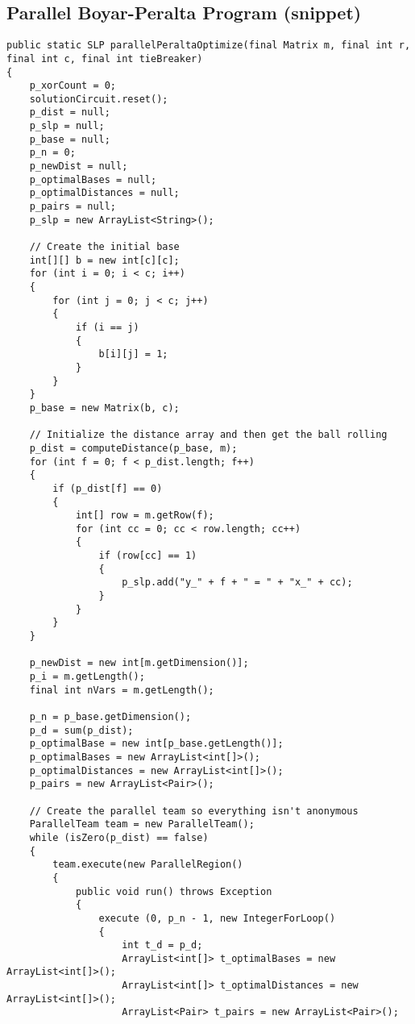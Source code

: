 \subsection{Parallel Boyar-Peralta Program (snippet)}
\begin{verbatim}
public static SLP parallelPeraltaOptimize(final Matrix m, final int r, final int c, final int tieBreaker) 
{
    p_xorCount = 0;
    solutionCircuit.reset();
    p_dist = null;
    p_slp = null;
    p_base = null;
    p_n = 0;
    p_newDist = null;
    p_optimalBases = null;
    p_optimalDistances = null;
    p_pairs = null;
    p_slp = new ArrayList<String>();

    // Create the initial base
    int[][] b = new int[c][c];
    for (int i = 0; i < c; i++)
    {
        for (int j = 0; j < c; j++)
        {
            if (i == j)
            {
                b[i][j] = 1;
            }
        }
    }
    p_base = new Matrix(b, c);
    
    // Initialize the distance array and then get the ball rolling
    p_dist = computeDistance(p_base, m);
    for (int f = 0; f < p_dist.length; f++)
    {
        if (p_dist[f] == 0)
        {
            int[] row = m.getRow(f);
            for (int cc = 0; cc < row.length; cc++)
            {
                if (row[cc] == 1)
                {
                    p_slp.add("y_" + f + " = " + "x_" + cc);
                }
            }
        }
    }

    p_newDist = new int[m.getDimension()];
    p_i = m.getLength();
    final int nVars = m.getLength();

    p_n = p_base.getDimension(); 
    p_d = sum(p_dist);
    p_optimalBase = new int[p_base.getLength()]; 
    p_optimalBases = new ArrayList<int[]>();
    p_optimalDistances = new ArrayList<int[]>();
    p_pairs = new ArrayList<Pair>();

    // Create the parallel team so everything isn't anonymous
    ParallelTeam team = new ParallelTeam();
    while (isZero(p_dist) == false)
    {
        team.execute(new ParallelRegion() 
        {
            public void run() throws Exception 
            {
                execute (0, p_n - 1, new IntegerForLoop()
                {
                    int t_d = p_d;
                    ArrayList<int[]> t_optimalBases = new ArrayList<int[]>();
                    ArrayList<int[]> t_optimalDistances = new ArrayList<int[]>();
                    ArrayList<Pair> t_pairs = new ArrayList<Pair>();


\end{verbatim}
